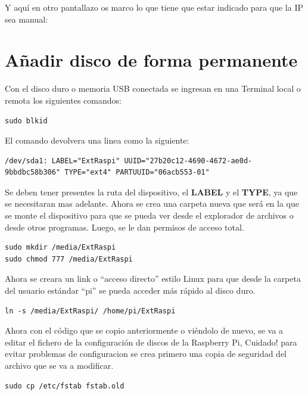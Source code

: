 \documentclass{article}
\begin{document}
Y aquí en otro pantallazo os marco lo que tiene que estar indicado para que la IP sea manual:

\section{Añadir disco de forma permanente}

Con el disco duro o memoria USB conectada se ingresan en una Terminal local o remota los siguientes comandos:

\begin{verbatim}
sudo blkid
\end{verbatim}

El comando devolvera una linea como la siguiente:

\begin{verbatim}
/dev/sda1: LABEL="ExtRaspi" UUID="27b20c12-4690-4672-ae0d-9bbdbc58b306" TYPE="ext4" PARTUUID="06acb553-01"
\end{verbatim}

Se deben tener presentes la ruta del dispositivo, el \textbf{LABEL} y el \textbf{TYPE}, ya que se necesitaran mas adelante. Ahora se crea una carpeta nueva que será en la que se monte el dispositivo para que se pueda ver desde el explorador de archivos o desde otros programas. Luego, se le dan  permisos de acceso total.

\begin{verbatim}
sudo mkdir /media/ExtRaspi
sudo chmod 777 /media/ExtRaspi
\end{verbatim}

Ahora se creara un link o “acceso directo” estilo Linux para que desde la carpeta del usuario estándar “pi” se pueda acceder más rápido al disco duro.

\begin{verbatim}
ln -s /media/ExtRaspi/ /home/pi/ExtRaspi
\end{verbatim}

Ahora con el código que se copio anteriormente o viéndolo de nuevo, se va a editar el fichero de la configuración de discos de la Raspberry Pi, Cuidado! para evitar problemas de configuracion se crea primero una copia de seguridad del archivo que se va a modificar.

\begin{verbatim}
sudo cp /etc/fstab fstab.old
\end{verbatim}
\end{document}
